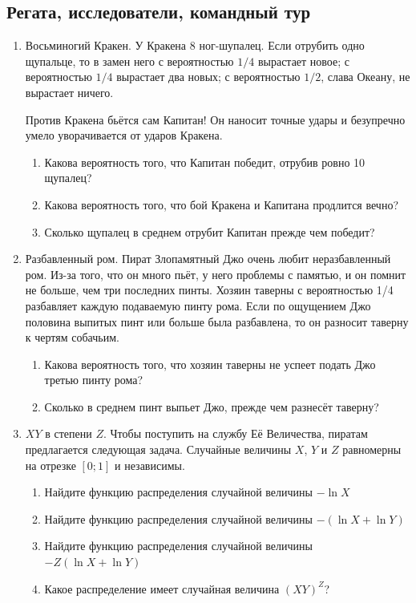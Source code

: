 \documentclass[12pt, a4paper]{article}\usepackage[]{graphicx}\usepackage[]{color}
\begin{document}
				\subsection{Регата, исследователи, командный тур}

				\begin{enumerate}
					\item Восьминогий Кракен. У Кракена 8 ног-шупалец. Если отрубить одно щупальце, то в замен него с вероятностью $1/4$ вырастает новое; с вероятностью $1/4$ вырастает два новых; с вероятностью $1/2$, слава Океану, не вырастает ничего.

					Против Кракена бьётся сам Капитан! Он наносит точные удары и безупречно умело уворачивается от ударов Кракена.

					\begin{enumerate}
						\item Какова вероятность того, что Капитан победит, отрубив ровно 10 щупалец?
						\item Какова вероятность того, что бой Кракена и Капитана продлится вечно?
						\item Сколько щупалец в среднем отрубит Капитан прежде чем победит?
					\end{enumerate}

					\item Разбавленный ром. Пират Злопамятный Джо очень любит неразбавленный ром. Из-за
					того, что он много пьёт, у него проблемы с памятью, и он помнит не
					больше, чем три последних пинты. Хозяин таверны с вероятностью 1/4 разбавляет
					каждую подаваемую пинту рома. Если по ощущением Джо половина выпитых
					пинт или больше была разбавлена, то он разносит таверну к чертям
					собачьим.


					\begin{enumerate}
						\item Какова вероятность того, что хозяин таверны не успеет подать Джо третью пинту рома?
						\item Сколько в среднем пинт выпьет Джо, прежде чем разнесёт таверну?
					\end{enumerate}

					\item $XY$ в степени $Z$. Чтобы поступить на службу Её Величества, пиратам предлагается следующая задача. Случайные величины $X$, $Y$ и $Z$ равномерны на отрезке $[0;1]$ и независимы.

					\begin{enumerate}
						\item Найдите функцию распределения случайной величины $-\ln X$
						\item Найдите функцию распределения случайной величины $-(\ln X + \ln Y)$
						\item Найдите функцию распределения случайной величины $-Z(\ln X + \ln Y)$
						\item Какое распределение имеет случайная величина $(XY)^Z$?
					\end{enumerate}


\end{enumerate}
\end{document}
